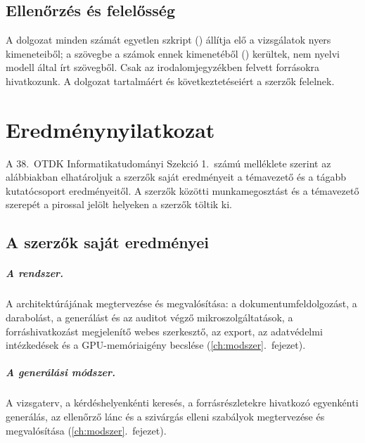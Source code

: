 \section{Ellenőrzés és felelősség}

A dolgozat minden számát egyetlen szkript () állítja elő a vizsgálatok nyers
kimeneteiből; a szövegbe a számok ennek kimenetéből () kerültek, nem nyelvi modell
által írt szövegből. Csak az irodalomjegyzékben felvett forrásokra hivatkozunk.  A dolgozat tartalmáért és
következtetéseiért a szerzők felelnek. 

\chapter{Eredménynyilatkozat}
\label{app-eredmeny}

A 38.~OTDK Informatikatudományi Szekció 1.~számú melléklete szerint az alábbiakban elhatároljuk a szerzők
saját eredményeit a témavezető és a tágabb kutatócsoport eredményeitől. A szerzők közötti munkamegosztást és a
témavezető szerepét a pirossal jelölt helyeken a szerzők töltik ki.

\section{A szerzők saját eredményei}

\paragraph{A rendszer.} A \Mimir{} architektúrájának megtervezése és megvalósítása: a dokumentumfeldolgozást, a
darabolást, a generálást és az auditot végző mikroszolgáltatások, a forráshivatkozást megjelenítő webes
szerkesztő, az export, az adatvédelmi intézkedések és a GPU-memóriaigény becslése
(\ref{ch:modszer}.~fejezet). 

\paragraph{A generálási módszer.} A vizsgaterv, a kérdéshelyenkénti keresés, a forrásrészletekre hivatkozó
egyenkénti generálás, az ellenőrző lánc és a szivárgás elleni szabályok megtervezése és megvalósítása
(\ref{ch:modszer}.~fejezet). 

